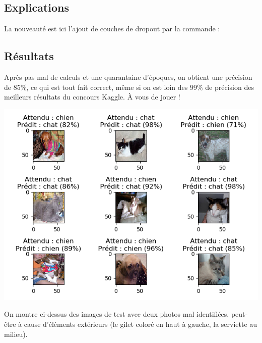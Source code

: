 \documentclass[11pt,class=report,crop=false]{standalone}
\begin{document}
\subsection{Explications}

La nouveauté est ici l'ajout de couches de dropout par la commande :


\subsection{Résultats}

Après pas mal de calculs et une quarantaine d'époques, on obtient une précision de $85\%$, ce qui est tout fait correct, même si on est loin des $99\%$ de précision des meilleurs résultats du concours \og{}Kaggle\fg{}. \`A vous de jouer !

\begin{center}
\includegraphics[scale=\myscale,scale=0.7]{figures/tfconv-chienchat-test}
\end{center}

On montre ci-dessus des images de test avec deux photos mal identifiées, peut-être à cause d'éléments extérieurs (le gilet coloré en haut à gauche, la serviette au milieu).




\end{document}
